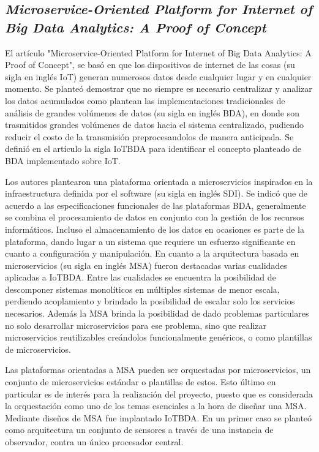 \subsection{\textbf{
        \emph{Microservice-Oriented Platform for Internet of Big Data Analytics: A Proof of Concept}
    }
}

El artículo "Microservice-Oriented Platform for Internet of Big Data Analytics: A Proof of Concept"\cite{li_microservice-oriented_2019}, se basó en que los dispositivos de internet de las cosas (su sigla en inglés IoT) generan numerosos datos desde cualquier lugar y en cualquier momento. Se planteó demostrar que no siempre es necesario centralizar y analizar los datos acumulados como plantean las implementaciones tradicionales de análisis de grandes volúmenes de datos (su sigla en inglés BDA), en donde son trasmitidos grandes volúmenes de datos hacia el sistema centralizado, pudiendo reducir el costo de la transmisión preprocesandolos de manera anticipada. Se definió en el artículo la sigla IoTBDA para identificar el concepto planteado de BDA implementado sobre IoT.\par

Los autores plantearon una plataforma orientada a microservicios inspirados en la infraestructura definida por el software (su sigla en inglés SDI).
Se indicó que de acuerdo a las especificaciones funcionales de las plataformas BDA, generalmente se combina el procesamiento de datos en conjunto con la gestión de los recursos informáticos. Incluso el almacenamiento de los datos en ocasiones es parte de la plataforma, dando lugar a un sistema que requiere un esfuerzo significante en cuanto a configuración y manipulación.
En cuanto a la arquitectura basada en microservicios (su sigla en inglés MSA) fueron destacadas varias cualidades aplicadas a IoTBDA. Entre las cualidades se encuentra la posibilidad de descomponer sistemas monolíticos en múltiples sistemas de menor escala, perdiendo acoplamiento y brindado la posibilidad de escalar solo los servicios necesarios. Además la MSA brinda la posibilidad de dado problemas particulares no solo desarrollar microservicios para ese problema, sino que realizar microservicios reutilizables creándolos funcionalmente genéricos, o como plantillas de microservicios.\par

Las plataformas orientadas a MSA pueden ser orquestadas por microservicios, un conjunto de microservicios estándar o plantillas de estos. Esto último en particular es de interés para la realización del proyecto, puesto que es considerada la orquestación como uno de los temas esenciales a la hora de diseñar una MSA. Mediante diseños de MSA fue implantado IoTBDA. En un primer caso se planteó como arquitectura un conjunto de sensores a través de una instancia de observador, contra un único procesador central.\par

